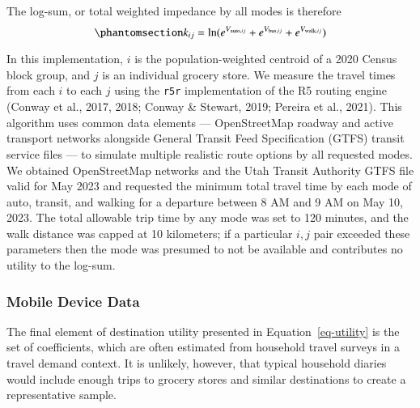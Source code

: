 \documentclass[
  letterpaper,
  number,
  review,
  3p]{elsarticle}
\begin{document}
The log-sum, or total weighted impedance by all modes is therefore
\begin{equation}\phantomsection\label{eq-mcls}{
k_{ij} = \ln(e^{V_{\mathrm{auto}, ij}} + e^{V_{\mathrm{bus}, ij}} + e^{V_{\mathrm{walk},ij}})
}\end{equation}

In this implementation, \(i\) is the population-weighted centroid of a
2020 Census block group, and \(j\) is an individual grocery store. We
measure the travel times from each \(i\) to each \(j\) using the
\texttt{r5r} implementation of the R5 routing engine (Conway et al.,
2017, 2018; Conway \& Stewart, 2019; Pereira et al., 2021). This
algorithm uses common data elements --- OpenStreetMap roadway and active
transport networks alongside General Transit Feed Specification (GTFS)
transit service files --- to simulate multiple realistic route options
by all requested modes. We obtained OpenStreetMap networks and the Utah
Transit Authority GTFS file valid for May 2023 and requested the minimum
total travel time by each mode of auto, transit, and walking for a
departure between 8 AM and 9 AM on May 10, 2023. The total allowable
trip time by any mode was set to 120 minutes, and the walk distance was
capped at 10 kilometers; if a particular \(i,j\) pair exceeded these
parameters then the mode was presumed to not be available and
contributes no utility to the log-sum.

\subsubsection{Mobile Device Data}\label{mobile-device-data}

The final element of destination utility presented in
Equation~\ref{eq-utility} is the set of coefficients, which are often
estimated from household travel surveys in a travel demand context. It
is unlikely, however, that typical household diaries would include
enough trips to grocery stores and similar destinations to create a
representative sample.
\end{document}
